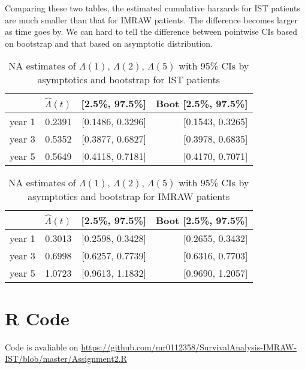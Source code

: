 \documentclass[11pt]{article}
\newcommand{\hLam}{\hat{\Lambda}}
\begin{document}
Comparing these two tables, the estimated cumulative harzards for IST patients
are much smaller than that for IMRAW patients. The difference becomes larger as
time goes by. We can hard to tell the difference between pointwise CIs based on
bootstrap and that based on asymptotic distribution.

\begin{table}[H]
\caption{NA estimates of $\Lambda(1)$, $\Lambda(2)$, $\Lambda(5)$ 
             with 95\% CIs by asymptotics and bootstrap for IST patients} 
\centering
\begin{tabular}{rrrr}
  \hline
  \hline
 & $\hLam(t)$ & [2.5\%, 97.5\%] & Boot [2.5\%, 97.5\%] \\ 
  \hline
  year 1 & 0.2391 & [0.1486, 0.3296] & [0.1543, 0.3265] \\ 
  year 3 & 0.5352 & [0.3877, 0.6827] & [0.3978, 0.6835] \\ 
  year 5 & 0.5649 & [0.4118, 0.7181] & [0.4170, 0.7071] \\ 
   \hline
\end{tabular}
\end{table}

\begin{table}[H]
\caption{NA estimates of $\Lambda(1)$, $\Lambda(2)$, $\Lambda(5)$ 
             with 95\% CIs by asymptotics and bootstrap for IMRAW patients} 
\centering
\begin{tabular}{rrrr}
  \hline
  \hline
 & $\hLam(t)$ & [2.5\%, 97.5\%] & Boot [2.5\%, 97.5\%] \\ 
  \hline
  year 1 & 0.3013 & [0.2598, 0.3428] & [0.2655, 0.3432] \\ 
  year 3 & 0.6998 & [0.6257, 0.7739] & [0.6316, 0.7703] \\ 
  year 5 & 1.0723 & [0.9613, 1.1832] & [0.9690, 1.2057] \\ 
   \hline
\end{tabular}
\end{table}

\appendix

\section{R Code}

Code is avaliable on \url{https://github.com/mr0112358/SurvivalAnalysis-IMRAW-IST/blob/master/Assignment2.R}
\end{document}
